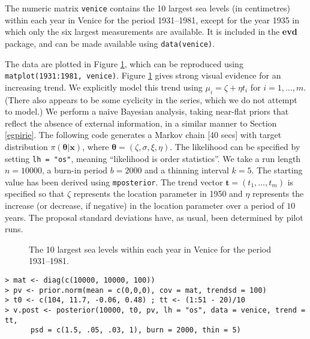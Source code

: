 \documentclass[11pt,a4paper]{article}
\newcommand{\bs}{\boldsymbol}
\begin{document}
The numeric matrix \verb+venice+ contains the 10 largest sea levels
(in centimetres) within each year in Venice for the period 1931--1981,
except for the year 1935 in which only the six largest measurements
are available.  It is included in the \textbf{evd} package, and can be
made available using \verb+data(venice)+.

The data are plotted in Figure \ref{vendata}, which can be reproduced
using \verb+matplot(1931:1981, venice)+.
Figure \ref{vendata} gives strong visual evidence for an increasing
trend.  We explicitly model this trend using $\mu_i = \zeta + \eta
t_i$ for $i=1,\dots,m$.  (There also appears to be some cyclicity in
the series, which we do not attempt to model.)  We perform a naive
Bayesian analysis, taking near-flat priors that reflect the absence of
external information, in a similar manner to Section \ref{egpirie}.
The following code generates a Markov chain [40 secs] with target
distribution $\pi(\bs{\theta}|\bs{x})$, where $\bs{\theta} =
(\zeta,\sigma,\xi,\eta)$.  The likelihood can be specified by setting
\verb+lh = "os"+, meaning ``likelihood is order statistics''.  We take
a run length $n=10000$, a burn-in period $b=2000$ and a thinning
interval $k=5$.  The starting value has been derived using
\verb+mposterior+.  The trend vector $\bs{t} = (t_1,\dots,t_m)$ is
specified so that $\zeta$ represents the location parameter in 1950
and $\eta$ represents the increase (or decrease, if negative) in the
location parameter over a period of $10$ years.  The proposal standard
deviations have, as usual, been determined by pilot runs.

\begin{figure}
\begin{center}
   \vspace{-1.5cm}
\end{center}
\caption{The 10 largest sea levels within each year in Venice for the
  period 1931--1981.}
\label{vendata}
\end{figure}

\begin{verbatim}
> mat <- diag(c(10000, 10000, 100))
> pv <- prior.norm(mean = c(0,0,0), cov = mat, trendsd = 100)
> t0 <- c(104, 11.7, -0.06, 0.48) ; tt <- (1:51 - 20)/10
> v.post <- posterior(10000, t0, pv, lh = "os", data = venice, trend = tt, 
      psd = c(1.5, .05, .03, 1), burn = 2000, thin = 5)
\end{verbatim}
\end{document}
